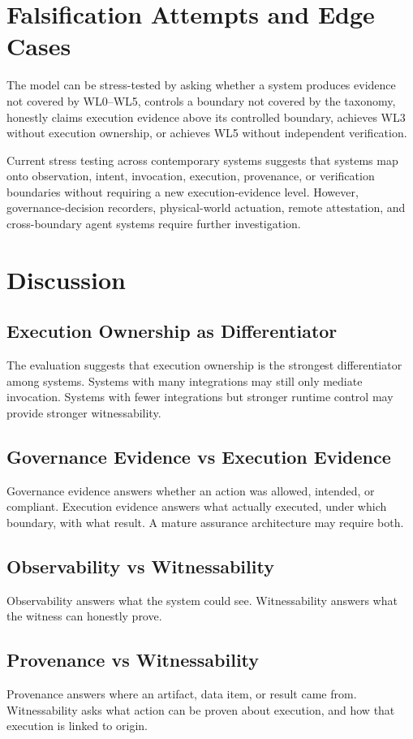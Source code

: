 \documentclass[11pt]{article}
\begin{document}
\section{Falsification Attempts and Edge Cases}

The model can be stress-tested by asking whether a system produces evidence not covered by WL0--WL5, controls a boundary not covered by the taxonomy, honestly claims execution evidence above its controlled boundary, achieves WL3 without execution ownership, or achieves WL5 without independent verification.

Current stress testing across contemporary systems suggests that systems map onto observation, intent, invocation, execution, provenance, or verification boundaries without requiring a new execution-evidence level. However, governance-decision recorders, physical-world actuation, remote attestation, and cross-boundary agent systems require further investigation.

\section{Discussion}

\subsection{Execution Ownership as Differentiator}
The evaluation suggests that execution ownership is the strongest differentiator among systems. Systems with many integrations may still only mediate invocation. Systems with fewer integrations but stronger runtime control may provide stronger witnessability.

\subsection{Governance Evidence vs Execution Evidence}
Governance evidence answers whether an action was allowed, intended, or compliant. Execution evidence answers what actually executed, under which boundary, with what result. A mature assurance architecture may require both.

\subsection{Observability vs Witnessability}
Observability answers what the system could see. Witnessability answers what the witness can honestly prove.

\subsection{Provenance vs Witnessability}
Provenance answers where an artifact, data item, or result came from. Witnessability asks what action can be proven about execution, and how that execution is linked to origin.
\end{document}
